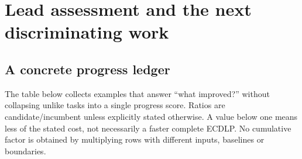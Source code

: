 \section{Lead assessment and the next discriminating work}\label{sec:assessment}

\subsection{A concrete progress ledger}

The table below collects examples that answer ``what improved?'' without
collapsing unlike tasks into a single progress score. Ratios are
candidate/incumbent unless explicitly stated otherwise. A value below one
means less of the stated cost, not necessarily a faster complete ECDLP.
No cumulative factor is obtained by multiplying rows with different
inputs, baselines or boundaries.

